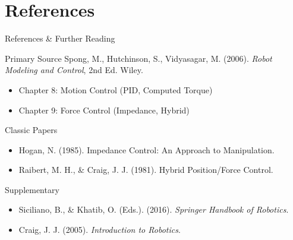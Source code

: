 \documentclass[10pt]{beamer}
\begin{document}
\section{References}
\begin{frame}{References \& Further Reading}
    \begin{block}{Primary Source}
        Spong, M., Hutchinson, S., Vidyasagar, M. (2006). \emph{Robot Modeling and Control}, 2nd Ed. Wiley.
        \begin{itemize}
            \item Chapter 8: Motion Control (PID, Computed Torque)
            \item Chapter 9: Force Control (Impedance, Hybrid)
        \end{itemize}
    \end{block}
    
    \begin{block}{Classic Papers}
        \begin{itemize}
            \item Hogan, N. (1985). Impedance Control: An Approach to Manipulation.
            \item Raibert, M. H., \& Craig, J. J. (1981). Hybrid Position/Force Control.
        \end{itemize}
    \end{block}
    
    \begin{block}{Supplementary}
        \begin{itemize}
            \item Siciliano, B., \& Khatib, O. (Eds.). (2016). \emph{Springer Handbook of Robotics}.
            \item Craig, J. J. (2005). \emph{Introduction to Robotics}.
        \end{itemize}
    \end{block}
\end{frame}
\end{document}
